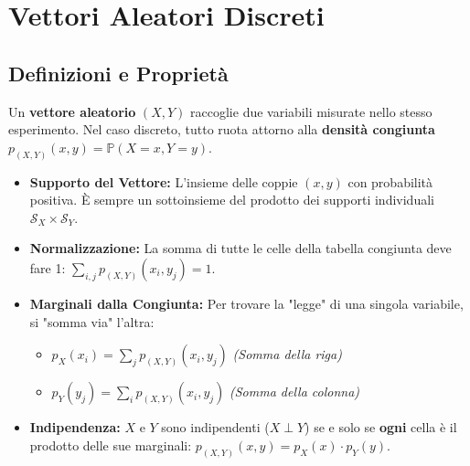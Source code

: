 \documentclass[12pt]{extarticle} %
\begin{document}
\newpage

\section{Vettori Aleatori Discreti}

\subsection{Definizioni e Proprietà}
Un \textbf{vettore aleatorio} $(X, Y)$ raccoglie due variabili misurate nello stesso esperimento. Nel caso discreto, tutto ruota attorno alla \textbf{densità congiunta} $p_{(X,Y)}(x,y) = \mathbb{P}(X=x, Y=y)$.

\begin{itemize}
    \item \textbf{Supporto del Vettore:} L'insieme delle coppie $(x,y)$ con probabilità positiva. È sempre un sottoinsieme del prodotto dei supporti individuali $\mathcal{S}_X \times \mathcal{S}_Y$.
    \item \textbf{Normalizzazione:} La somma di tutte le celle della tabella congiunta deve fare 1: $\sum_{i,j} p_{(X,Y)}(x_i, y_j) = 1$.
    \item \textbf{Marginali dalla Congiunta:} Per trovare la "legge" di una singola variabile, si "somma via" l'altra:
    \begin{itemize}
        \item $p_X(x_i) = \sum_{j} p_{(X,Y)}(x_i, y_j)$ \textit{(Somma della riga)}
        \item $p_Y(y_j) = \sum_{i} p_{(X,Y)}(x_i, y_j)$ \textit{(Somma della colonna)}
    \end{itemize}
    \item \textbf{Indipendenza:} $X$ e $Y$ sono indipendenti ($X \perp Y$) se e solo se \textbf{ogni} cella è il prodotto delle sue marginali: $p_{(X,Y)}(x,y) = p_X(x) \cdot p_Y(y)$.
\end{itemize}
\end{document}
